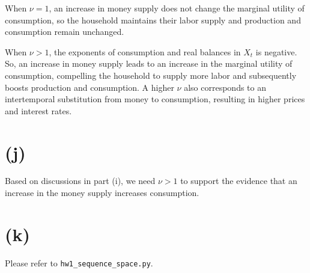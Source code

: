 \documentclass[12pt]{article}
\begin{document}
When $\nu = 1$, an increase in money supply does not change the marginal utility of consumption, 
so the household maintains their labor supply 
and production and consumption remain unchanged.  

When $\nu > 1$, the exponents of consumption and real balances in $X_{t}$ is negative. 
So, an increase in money supply leads to an increase in the marginal utility of consumption, 
compelling the household to supply more labor and subsequently boosts production and consumption. 
A higher $\nu$ also corresponds to an intertemporal substitution from money to consumption, 
resulting in higher prices and interest rates.

\section*{(j)}

Based on discussions in part (i), we need $\nu > 1$ to support the evidence 
that an increase in the money supply increases consumption.

\section*{(k)}

Please refer to \texttt{hw1\_sequence\_space.py}.
\end{document}
